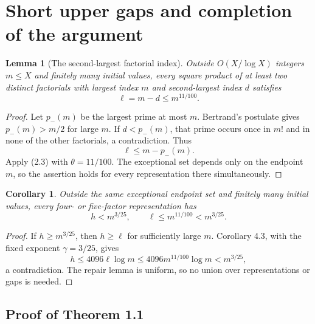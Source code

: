 \documentclass[letterpaper]{article}
\newtheorem{lemma}[theorem]{Lemma}
\newtheorem{corollary}[theorem]{Corollary}
\theoremstyle{definition}
\theoremstyle{remark}
\numberwithin{equation}{section}
\begin{document}
\section{Short upper gaps and completion of the argument}

\begin{lemma}[The second-largest factorial index]
Outside $O(X/\log X)$ integers $m\le X$ and
finitely many initial values, every square product of at least two distinct factorials with largest
index $m$ and second-largest index $d$ satisfies
\[
  \ell=m-d\le m^{11/100}.
\]
\end{lemma}

\begin{proof}
Let $p_-(m)$ be the largest prime at most $m$. Bertrand's postulate gives $p_-(m)>m/2$
for large $m$. If $d<p_-(m)$, that prime occurs once in $m!$ and in none of the other factorials, a
contradiction. Thus
\[
  \ell\le m-p_-(m).
\]
Apply (2.3) with $\theta=11/100$. The exceptional set depends only on the endpoint $m$, so the
assertion holds for every representation there simultaneously.
\end{proof}

\begin{corollary}
Outside the same exceptional endpoint set and finitely many initial values, every
four- or five-factor representation has
\[
  h<m^{3/25},\qquad \ell\le m^{11/100}<m^{3/25}.
\]
\end{corollary}

\begin{proof}
If $h\ge m^{3/25}$, then $h\ge\ell$ for sufficiently large $m$. Corollary 4.3, with the fixed exponent
$\gamma=3/25$, gives
\[
  h\le 4096\ell\log m\le 4096m^{11/100}\log m<m^{3/25},
\]
a contradiction. The repair lemma is uniform, so no union over representations or gaps is
needed.
\end{proof}

\subsection{Proof of Theorem 1.1}
\end{document}
